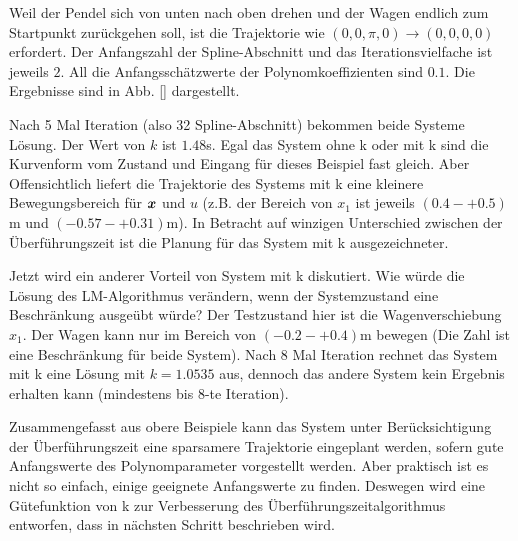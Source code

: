 \begin{beispiel}
	Weil der Pendel sich von unten nach oben drehen und der Wagen endlich zum Startpunkt zurückgehen soll, ist die Trajektorie wie $\left ( 0,0,\pi ,0 \right )\rightarrow \left ( 0,0,0,0 \right )$ erfordert. Der Anfangszahl der Spline-Abschnitt und das Iterationsvielfache ist jeweils $2$. All die Anfangsschätzwerte der Polynomkoeffizienten sind $0.1$. Die Ergebnisse sind in Abb. \ref{} dargestellt.
	
	Nach 5 Mal Iteration (also 32 Spline-Abschnitt) bekommen beide Systeme Lösung. Der Wert von $k$ ist $1.48$s. Egal das System ohne k oder mit k sind die Kurvenform vom Zustand und Eingang für dieses Beispiel fast gleich. Aber Offensichtlich liefert die Trajektorie des Systems mit k eine kleinere Bewegungsbereich für $\boldsymbol x$ und $u$ (z.B. der Bereich von $x_{1}$ ist jeweils $(0.4-+0.5)$m und $(-0.57-+0.31)$m). In Betracht auf winzigen Unterschied zwischen der Überführungszeit ist die Planung für das System mit k ausgezeichneter.
	
	Jetzt wird ein anderer Vorteil von System mit k diskutiert. Wie würde die Lösung des LM-Algorithmus verändern, wenn der Systemzustand eine Beschränkung ausgeübt würde? Der Testzustand hier ist die Wagenverschiebung $x_{1}$. Der Wagen kann nur im Bereich von $(-0.2-+0.4)$m bewegen (Die Zahl ist eine Beschränkung für beide System). Nach 8 Mal Iteration rechnet das System mit k eine Lösung mit $k=1.0535$ aus, dennoch das andere System kein Ergebnis erhalten kann (mindestens bis 8-te Iteration).
\end{beispiel}
Zusammengefasst aus obere Beispiele kann das System unter Berücksichtigung der Überführungszeit eine sparsamere Trajektorie eingeplant werden, sofern gute Anfangswerte des Polynomparameter vorgestellt werden. Aber praktisch ist es nicht so einfach, einige geeignete Anfangswerte zu finden. Deswegen wird eine Gütefunktion von k zur Verbesserung des Überführungszeitalgorithmus entworfen, dass in nächsten Schritt beschrieben wird.
